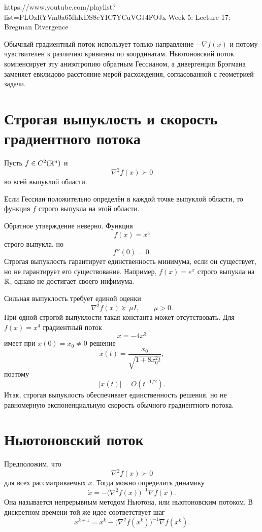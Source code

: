 
\sourcevideo
    {https://www.youtube.com/playlist?list=PLOzRYVm0a65fhKDS8cYIC7YCuVGJ4FOJx}
    {Week 5: Lecture 17: Bregman Divergence}

Обычный градиентный поток использует только направление
\(-\nabla f(x)\) и потому чувствителен к различию кривизны по
координатам. Ньютоновский поток компенсирует эту анизотропию обратным
Гессианом, а дивергенция Брэгмана заменяет евклидово расстояние мерой
расхождения, согласованной с геометрией задачи.

\section{Строгая выпуклость и скорость градиентного потока}

Пусть \(f\in C^2(\mathbb{R}^n)\) и
\[
    \nabla^2f(x)\succ0
\]
во всей выпуклой области.

\begin{theorem}
Если Гессиан положительно определён в каждой точке выпуклой области,
то функция \(f\) строго выпукла на этой области.
\end{theorem}

Обратное утверждение неверно. Функция
\[
    f(x)=x^4
\]
строго выпукла, но
\[
    f''(0)=0.
\]
Строгая выпуклость гарантирует единственность минимума, если он
существует, но не гарантирует его существование. Например,
\(f(x)=e^x\) строго выпукла на \(\mathbb{R}\), однако не достигает своего
инфимума.

Сильная выпуклость требует единой оценки
\[
    \nabla^2f(x)\succeq\mu I,
    \qquad
    \mu>0.
\]
При одной строгой выпуклости такая константа может отсутствовать.
Для \(f(x)=x^4\) градиентный поток
\[
    \dot x=-4x^3
\]
имеет при \(x(0)=x_0\ne0\) решение
\[
    x(t)
    =
    \frac{x_0}{\sqrt{1+8x_0^2t}},
\]
поэтому
\[
    |x(t)|=O(t^{-1/2}).
\]
Итак, строгая выпуклость обеспечивает единственность решения, но не
равномерную экспоненциальную скорость обычного градиентного потока.

\section{Ньютоновский поток}

Предположим, что
\[
    \nabla^2f(x)\succ0
\]
для всех рассматриваемых \(x\). Тогда можно определить динамику
\[
    \dot x
    =
    -\bigl(\nabla^2f(x)\bigr)^{-1}\nabla f(x).
\]
Она называется непрерывным методом Ньютона, или ньютоновским
потоком. В дискретном времени той же идее соответствует шаг
\[
    x^{k+1}
    =
    x^k-
    \bigl(\nabla^2f(x^k)\bigr)^{-1}\nabla f(x^k).
\]

